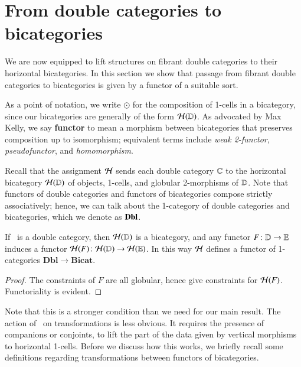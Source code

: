 \section{From double categories to bicategories}
\label{sec:1x1-to-bicat}

We are now equipped to lift structures on fibrant double categories to
their horizontal bicategories.  In this section we show that passage
from fibrant double categories to bicategories is given by a functor of a suitable sort.

As a point of notation, we write $\odot$ for the composition of
1-cells in a bicategory, since our bicategories are generally of the
form $\mathcal{H}(\mathbb{D})$.  As advocated by Max Kelly, we say \textbf{functor}
to mean a morphism between bicategories that preserves composition up
to isomorphism; equivalent terms include \emph{weak 2-functor},
\emph{pseudofunctor}, and \emph{homomorphism}.

Recall that the assignment $\mathcal{H}$ sends each double category $\mathbb{C}$ to the horizontal bicategory  $\mathcal{H}(\mathbb{D})$ of objects, 1-cells, and globular 2-morphisms of $\mathbb{D}$.  Note that functors of double categories and functors of bicategories compose strictly associatively; hence, we can talk about the 1-category of double categories and bicategories, which we denote as ${\bf Dbl}$.  

\begin{thm}\label{thm:1-func}
 If \lD\ is a double category, then $\mathcal{H}(\mathbb{D})$ is a bicategory, and
  any functor $F\colon \mathbb{D}\to\mathbb{E}$ induces a functor $\mathcal{H}(F)\colon
  \mathcal{H}(\mathbb{D})\to\mathcal{H}(\mathbb{E})$.  In this way $\mathcal{H}$ defines a functor of
  1-categories $\mathbf{Dbl}\to \mathbf{Bicat}$.
\end{thm}
\begin{proof}
 The constraints of $F$ are all globular, hence give constraints for
  $\mathcal{H}(F)$.  Functoriality is evident.
\end{proof}

Note that this is a stronger condition than we need for our main result. The action of \cH\ on transformations is less obvious. It
requires the presence of companions or conjoints, to lift the part of the data given by vertical morphisms to horizontal 1-cells. Before we discuss how this works, we briefly recall some definitions regarding transformations between functors of bicategories.

